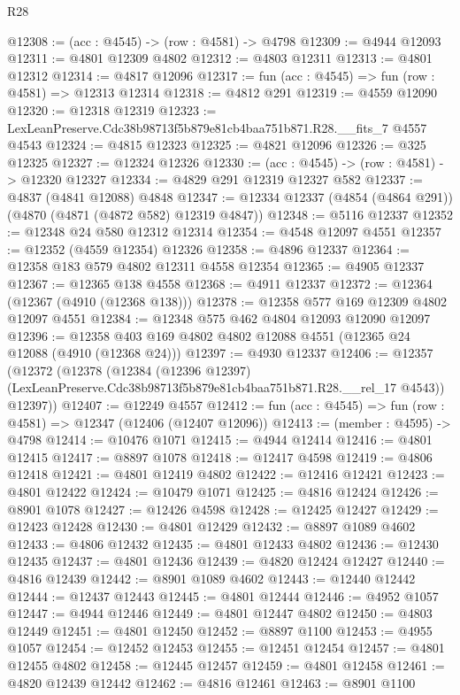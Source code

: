 \begin{lexlean}{R28}
\begin{coremodule}
@12308 := (acc : @4545) -> (row : @4581) -> @4798
@12309 := @4944 @12093
@12311 := @4801 @12309 @4802
@12312 := @4803 @12311
@12313 := @4801 @12312
@12314 := @4817 @12096
@12317 := fun (acc : @4545) => fun (row : @4581) => @12313 @12314
@12318 := @4812 @291
@12319 := @4559 @12090
@12320 := @12318 @12319
@12323 := LexLeanPreserve.Cdc38b98713f5b879e81cb4baa751b871.R28.__fits_7 @4557 @4543
@12324 := @4815 @12323
@12325 := @4821 @12096
@12326 := @325 @12325
@12327 := @12324 @12326
@12330 := (acc : @4545) -> (row : @4581) -> @12320 @12327
@12334 := @4829 @291 @12319 @12327 @582
@12337 := @4837 (@4841 @12088) @4848
@12347 := @12334 @12337 (@4854 (@4864 @291)) (@4870 (@4871 (@4872 @582) @12319 @4847))
@12348 := @5116 @12337
@12352 := @12348 @24 @580 @12312 @12314
@12354 := @4548 @12097 @4551
@12357 := @12352 (@4559 @12354) @12326
@12358 := @4896 @12337
@12364 := @12358 @183 @579 @4802 @12311 @4558 @12354
@12365 := @4905 @12337
@12367 := @12365 @138 @4558
@12368 := @4911 @12337
@12372 := @12364 (@12367 (@4910 (@12368 @138)))
@12378 := @12358 @577 @169 @12309 @4802 @12097 @4551
@12384 := @12348 @575 @462 @4804 @12093 @12090 @12097
@12396 := @12358 @403 @169 @4802 @4802 @12088 @4551 (@12365 @24 @12088 (@4910 (@12368 @24)))
@12397 := @4930 @12337
@12406 := @12357
    (@12372
      (@12378
        (@12384
          (@12396 @12397)
          (LexLeanPreserve.Cdc38b98713f5b879e81cb4baa751b871.R28.__rel_17 @4543))
        @12397))
@12407 := @12249 @4557
@12412 := fun (acc : @4545) => fun (row : @4581) => @12347 (@12406 (@12407 @12096))
@12413 := (member : @4595) -> @4798
@12414 := @10476 @1071
@12415 := @4944 @12414
@12416 := @4801 @12415
@12417 := @8897 @1078
@12418 := @12417 @4598
@12419 := @4806 @12418
@12421 := @4801 @12419 @4802
@12422 := @12416 @12421
@12423 := @4801 @12422
@12424 := @10479 @1071
@12425 := @4816 @12424
@12426 := @8901 @1078
@12427 := @12426 @4598
@12428 := @12425 @12427
@12429 := @12423 @12428
@12430 := @4801 @12429
@12432 := @8897 @1089 @4602
@12433 := @4806 @12432
@12435 := @4801 @12433 @4802
@12436 := @12430 @12435
@12437 := @4801 @12436
@12439 := @4820 @12424 @12427
@12440 := @4816 @12439
@12442 := @8901 @1089 @4602
@12443 := @12440 @12442
@12444 := @12437 @12443
@12445 := @4801 @12444
@12446 := @4952 @1057
@12447 := @4944 @12446
@12449 := @4801 @12447 @4802
@12450 := @4803 @12449
@12451 := @4801 @12450
@12452 := @8897 @1100
@12453 := @4955 @1057
@12454 := @12452 @12453
@12455 := @12451 @12454
@12457 := @4801 @12455 @4802
@12458 := @12445 @12457
@12459 := @4801 @12458
@12461 := @4820 @12439 @12442
@12462 := @4816 @12461
@12463 := @8901 @1100

\end{coremodule}
\end{lexlean}
